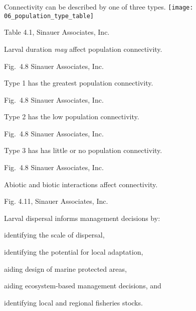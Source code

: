 \documentclass[t]{beamer}
\begin{document}
\begin{frame}[t]{Connectivity can be described by one of three types.}
\centering
\texttt{[image: 06\_population\_type\_table]}

	\vfilll

	\hfill \tiny Table 4.1, \textcopyright Sinauer Associates, Inc.

\end{frame}
%
{
\begin{frame}[b]{Larval duration \emph{may} affect population connectivity.}

\hfill \tiny Fig.~4.8 \textcopyright Sinauer Associates, Inc.

\end{frame}
}
%
{
\begin{frame}[b]{Type 1 has the greatest population connectivity.}

\hfill \tiny Fig.~4.8 \textcopyright Sinauer Associates, Inc.

\end{frame}
}
%
{
\begin{frame}[b]{Type 2 has the low population connectivity.}

\hfill \tiny Fig.~4.8 \textcopyright Sinauer Associates, Inc.

\end{frame}
}
%
{
\begin{frame}[b]{Type 3 has has little or no population connectivity.}

\hfill \tiny Fig.~4.8 \textcopyright Sinauer Associates, Inc.

\end{frame}
}
%
{
\begin{frame}[b]{Abiotic and biotic interactions affect connectivity.}

	\tiny Fig. 4.11, \textcopyright Sinauer Associates, Inc.
\end{frame}
}
%


\begin{frame}[t]{Larval dispersal informs management decisions by:}

	\hangpara identifying the scale of dispersal,
	
	\hangpara identifying the potential for local adaptation,

	\hangpara aiding design of marine protected areas,
	
	\hangpara aiding ecosystem-based management decisions, and
	
	\hangpara identifying local and regional fisheries stocks.
		
\end{frame}
\end{document}
